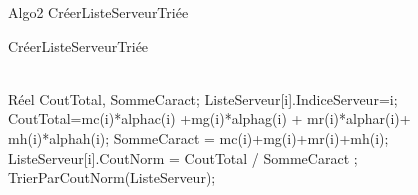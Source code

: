Algo2 CréerListeServeurTriée
\begin{algorithm}[H]
\caption{CréerListeServeurTriée}
\label{algo2}
\begin{algorithmic}[1]
\\
\LOOP
	\STATE Réel CoutTotal, SommeCaract;
		\STATE ListeServeur[i].IndiceServeur=i;
		\STATE CoutTotal=mc(i)*alphac(i) +mg(i)*alphag(i) + mr(i)*alphar(i)+ mh(i)*alphah(i);
		\STATE SommeCaract = mc(i)+mg(i)+mr(i)+mh(i);
		\STATE ListeServeur[i].CoutNorm = CoutTotal / SommeCaract ;
	\ENDFOR
	\STATE TrierParCoutNorm(ListeServeur);
\ENDLOOP
\end{algorithmic}
\end{algorithm}